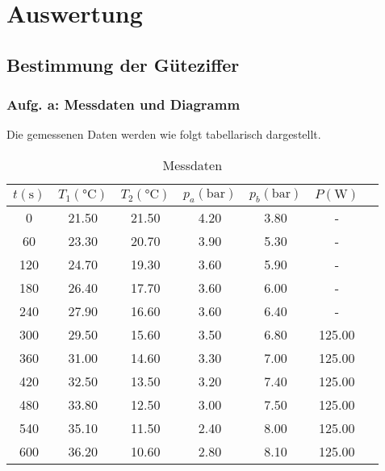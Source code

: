 \newpage
\section{Auswertung}
\label{sec:Auswertung}

\subsection{Bestimmung der Güteziffer}

\subsubsection{Aufg. a: Messdaten und Diagramm}

Die gemessenen Daten werden wie folgt tabellarisch dargestellt. 

\begin{table}
  \centering
  \caption{Messdaten}
  \label{tab:Messdaten}
  \begin{tabular}{c c c c c c c}  %
    \toprule
    {$t (\unit{\second})$} &
    {$T_{1} (\unit{\celsius})$}&
    {$T_{2} (\unit{\celsius})$}&
    {$p_{a} (\unit{\bar})$}&
    {$p_{b} (\unit{\bar})$}&
    {$P (\unit{\watt})$} \\
    \midrule
        0 &    21.50 &     21.50 &       4.20 &       3.80 &      - \\
      60 &    23.30 &     20.70 &       3.90 &       5.30 &      - \\
      120 &    24.70 &     19.30 &       3.60 &       5.90 &      - \\
      180 &    26.40 &     17.70 &       3.60 &       6.00 &      - \\
      240 &    27.90 &     16.60 &       3.60 &       6.40 &      - \\
      300 &    29.50 &     15.60 &       3.50 &       6.80 & 125.00 \\
      360 &    31.00 &     14.60 &       3.30 &       7.00 & 125.00 \\
      420 &    32.50 &     13.50 &       3.20 &       7.40 & 125.00 \\
      480 &    33.80 &     12.50 &       3.00 &       7.50 & 125.00 \\
      540 &    35.10 &     11.50 &       2.40 &       8.00 & 125.00 \\
      600 &    36.20 &     10.60 &       2.80 &       8.10 & 125.00 \\

\end{tabular}
\end{table}
